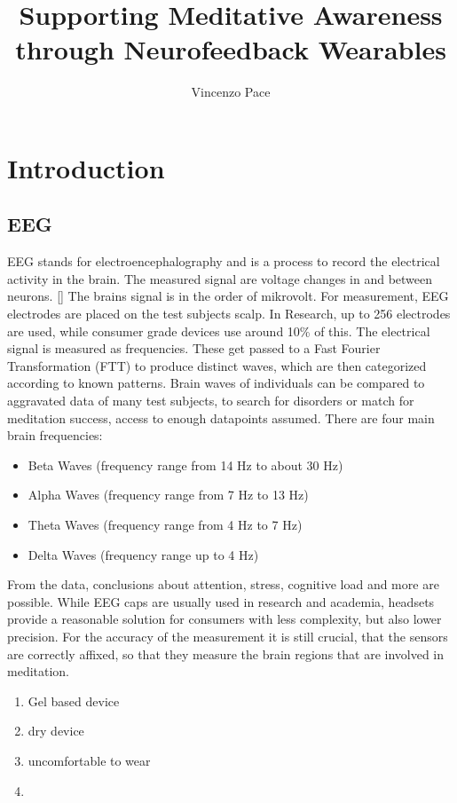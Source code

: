 \documentclass{llncs} %
\begin{document}
\title{Supporting Meditative Awareness through Neurofeedback Wearables}
\author{Vincenzo Pace}
\maketitle
\newpage
\section{Introduction}
\subsection{EEG}
EEG stands for electroencephalography and is a process to record the electrical activity in the brain. The measured signal are voltage changes in and between neurons.
[] The brains signal is in the order of mikrovolt. For measurement, EEG electrodes are placed on the test subjects scalp. In Research, up to 256 electrodes are used, while consumer grade devices use around 10\% of this. The electrical signal is measured as frequencies. These get passed to a Fast Fourier Transformation (FTT) to produce distinct waves, which are then categorized according to known patterns.
Brain waves of individuals can be compared to aggravated data of many test subjects, to search for disorders or match for meditation success, access to enough datapoints assumed.
There are four main brain frequencies:

\begin{itemize}
    \item 
    Beta Waves (frequency range from 14 Hz to about 30 Hz)
    \item 
    Alpha Waves (frequency range from 7 Hz to 13 Hz)
    \item 
    Theta Waves (frequency range from 4 Hz to 7 Hz)
    \item 
    Delta Waves (frequency range up to 4 Hz)
\end{itemize}
From the data, conclusions about attention, stress, cognitive load and more are possible.
While EEG caps are usually used in research and academia, headsets provide a reasonable solution for consumers with less complexity, but also lower precision.
For the accuracy of the measurement it is still crucial, that the sensors are correctly affixed, so that they measure the brain regions that are involved in meditation.

\begin{enumerate}
    \item Gel based device
    \item dry device
    \item uncomfortable to wear 
    \item 
\end{enumerate}
\end{document}
